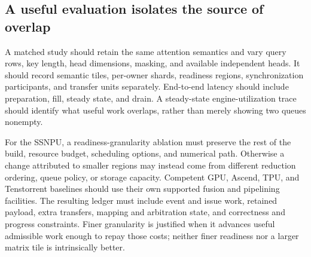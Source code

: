 \subsection{A useful evaluation isolates the source of overlap}

A matched study should retain the same attention semantics and vary query rows, key length, head dimensions, masking, and available independent heads. It should record semantic tiles, per-owner shards, readiness regions, synchronization participants, and transfer units separately. End-to-end latency should include preparation, fill, steady state, and drain. A steady-state engine-utilization trace should identify what useful work overlaps, rather than merely showing two queues nonempty.

For the SSNPU, a readiness-granularity ablation must preserve the rest of the build, resource budget, scheduling options, and numerical path. Otherwise a change attributed to smaller regions may instead come from different reduction ordering, queue policy, or storage capacity. Competent GPU, Ascend, TPU, and Tenstorrent baselines should use their own supported fusion and pipelining facilities. The resulting ledger must include event and issue work, retained payload, extra transfers, mapping and arbitration state, and correctness and progress constraints. Finer granularity is justified when it advances useful admissible work enough to repay those costs; neither finer readiness nor a larger matrix tile is intrinsically better.
